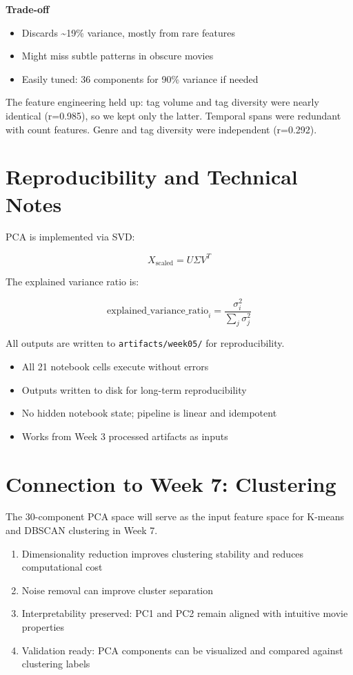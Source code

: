 \documentclass[11pt]{article}
\begin{document}
\textbf{Trade-off}

\begin{itemize}[leftmargin=1.5em]
    \item Discards \textasciitilde 19\% variance, mostly from rare features
    \item Might miss subtle patterns in obscure movies
    \item Easily tuned: 36 components for 90\% variance if needed
\end{itemize}

The feature engineering held up: tag volume and tag diversity were nearly identical (r=0.985), so we kept only the latter. Temporal spans were redundant with count features. Genre and tag diversity were independent (r=0.292).

\section{Reproducibility and Technical Notes}

PCA is implemented via SVD:

\[
X_{\text{scaled}} = U \Sigma V^T
\]

The explained variance ratio is:

\[
\text{explained\_variance\_ratio}_i = \frac{\sigma_i^2}{\sum_j \sigma_j^2}
\]

All outputs are written to \texttt{artifacts/week05/} for reproducibility.

\begin{itemize}[leftmargin=1.5em]
    \item All 21 notebook cells execute without errors
    \item Outputs written to disk for long-term reproducibility
    \item No hidden notebook state; pipeline is linear and idempotent
    \item Works from Week 3 processed artifacts as inputs
\end{itemize}

\section{Connection to Week 7: Clustering}

The 30-component PCA space will serve as the input feature space for K-means and DBSCAN clustering in Week 7.

\begin{enumerate}[leftmargin=1.5em]
    \item Dimensionality reduction improves clustering stability and reduces computational cost
    \item Noise removal can improve cluster separation
    \item Interpretability preserved: PC1 and PC2 remain aligned with intuitive movie properties
    \item Validation ready: PCA components can be visualized and compared against clustering labels
\end{enumerate}
\end{document}
